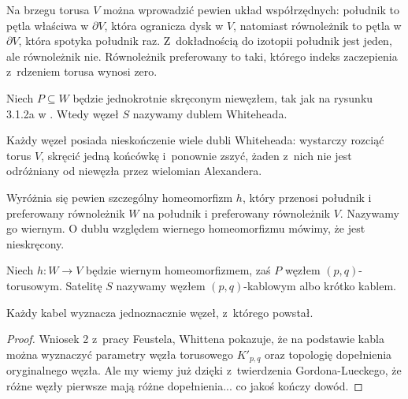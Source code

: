 Na brzegu torusa $V$ można wprowadzić pewien układ współrzędnych: południk to pętla właściwa w $\partial V$, która ogranicza dysk w $V$, natomiast równoleżnik to pętla w $\partial V$, która spotyka południk raz.
Z~dokładnością do izotopii południk jest jeden, ale równoleżnik nie.
Równoleżnik preferowany to taki, którego indeks zaczepienia z~rdzeniem torusa wynosi zero.

\begin{definition}
%
    Niech $P \subseteq W$ będzie jednokrotnie skręconym niewęzłem, tak jak na rysunku 3.1.2a w \cite[s. 32]{kawauchi1996}.
    Wtedy węzeł $S$ nazywamy dublem Whiteheada.
\end{definition}

Każdy węzeł posiada nieskończenie wiele dubli Whiteheada: wystarczy rozciąć torus $V$, skręcić jedną końcówkę i~ponownie zszyć, żaden z~nich nie jest odróżniany od niewęzła przez wielomian Alexandera.

Wyróżnia się pewien szczególny homeomorfizm $h$, który przenosi południk i preferowany równoleżnik $W$ na południk i preferowany równoleżnik $V$.
Nazywamy go wiernym.
O dublu względem wiernego homeomorfizmu mówimy, że jest nieskręcony.

\begin{definition}
%
    Niech $h \colon W \to V$ będzie wiernym homeomorfizmem, zaś $P$ węzłem $(p, q)$-torusowym.
    Satelitę $S$ nazywamy węzłem $(p, q)$-kablowym albo krótko kablem.
\end{definition}

\begin{proposition}
    Każdy kabel wyznacza jednoznacznie węzeł, z~którego powstał.
\end{proposition}

\begin{proof}
%
%
    Wniosek 2 z~pracy Feustela, Whittena \cite{feustel1978} pokazuje, że na podstawie kabla można wyznaczyć parametry węzła torusowego $K'_{p,q}$ oraz topologię dopełnienia oryginalnego węzła.
    Ale my wiemy już dzięki z~twierdzenia Gordona-Lueckego, że różne węzły pierwsze mają różne dopełnienia... co jakoś kończy dowód.
\end{proof}

